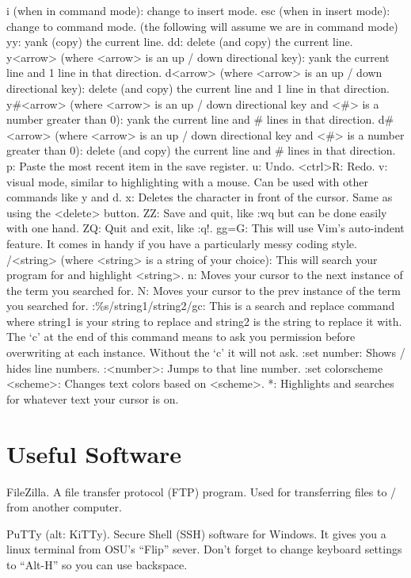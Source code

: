 \documentclass[letterpaper,10pt,titlepage,fleqn]{article}
\begin{document}
i (when in command mode): change to insert mode.
esc (when in insert mode): change to command mode.
(the following will assume we are in command mode)
yy: yank (copy) the current line.
dd: delete (and copy) the current line.
y<arrow> (where <arrow> is an up / down directional key): yank the current line and 1 line in that direction.
d<arrow> (where <arrow> is an up / down directional key): delete (and copy) the current line and 1 line in that direction.
y\#<arrow> (where <arrow> is an up / down directional key and <\#> is a number
greater than 0): yank the current line and \# lines in that direction.
d\#<arrow> (where <arrow> is an up / down directional key and <\#> is a number
greater than 0): delete (and copy) the current line and \# lines in that direction.
p: Paste the most recent item in the save register. 
u: Undo.
<ctrl>R: Redo.
v: visual mode, similar to highlighting with a mouse. Can be used with other commands like y and d.
x: Deletes the character in front of the cursor. Same as using the <delete> button.
ZZ: Save and quit, like :wq but can be done easily with one hand.
ZQ: Quit and exit, like :q!.
gg=G: This will use Vim’s auto-indent feature. It comes in handy if you have a particularly messy coding style.
/<string> (where <string> is a string of your choice): This will search your program for and highlight <string>.
n: Moves your cursor to the next instance of the term you searched for.
N: Moves your cursor to the prev instance of the term you searched for. 
:\%s/string1/string2/gc: This is a search and replace command where string1 is your string to replace and string2 is the string to replace it with. The ‘c’ at the end of this command means to ask you permission before overwriting at each instance. Without the ‘c’ it will not ask.
:set number: Shows / hides line numbers.
:<number>: Jumps to that line number.
:set colorscheme <scheme>: Changes text colors based on <scheme>. 
*: Highlights and searches for whatever text your cursor is on.



\section{Useful Software}
FileZilla. A file transfer protocol (FTP) program. Used for transferring files to / from another computer. 

PuTTy (alt: KiTTy). Secure Shell (SSH) software for Windows. It gives you a linux terminal from OSU’s “Flip” sever. Don’t forget to change keyboard settings to “Alt-H” so you can use backspace. 
\end{document}
